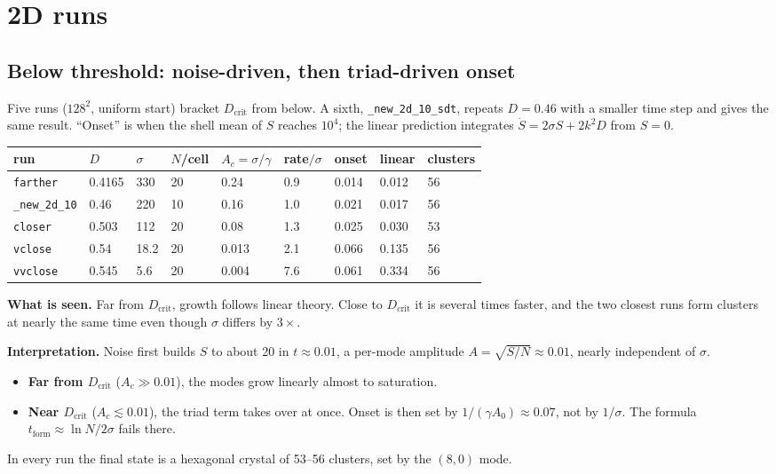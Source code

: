 \documentclass[11pt]{article}
\newcommand{\code}[1]{\texttt{#1}}
\newcommand{\Dc}{D_{\mathrm{crit}}}
\begin{document}
\section{2D runs}

\subsection{Below threshold: noise-driven, then triad-driven onset}
Five runs ($128^2$, uniform start) bracket $\Dc$ from below. A sixth,
\code{\_new\_2d\_10\_sdt}, repeats $D=0.46$ with a smaller time step and gives
the same result. ``Onset'' is when the shell mean of $S$ reaches $10^4$; the
linear prediction integrates $\dot S=2\sigma S+2k^2D$ from $S=0$.
\begin{center}
\begin{tabular}{@{}lllllllll@{}}
\toprule
run & $D$ & $\sigma$ & $N$/cell & $A_c=\sigma/\gamma$ & rate$/\sigma$ & onset & linear & clusters \\
\midrule
\code{farther} & 0.4165 & 330 & 20 & 0.24 & 0.9 & 0.014 & 0.012 & 56 \\
\code{\_new\_2d\_10} & 0.46 & 220 & 10 & 0.16 & 1.0 & 0.021 & 0.017 & 56 \\
\code{closer} & 0.503 & 112 & 20 & 0.08 & 1.3 & 0.025 & 0.030 & 53 \\
\code{vclose} & 0.54 & 18.2 & 20 & 0.013 & 2.1 & 0.066 & 0.135 & 56 \\
\code{vvclose} & 0.545 & 5.6 & 20 & 0.004 & 7.6 & 0.061 & 0.334 & 56 \\
\bottomrule
\end{tabular}
\end{center}
\textbf{What is seen.} Far from $\Dc$, growth follows linear theory. Close to
$\Dc$ it is several times faster, and the two closest runs form clusters at
nearly the same time even though $\sigma$ differs by $3\times$.

\textbf{Interpretation.} Noise first builds $S$ to about 20 in $t\approx0.01$,
a per-mode amplitude $A=\sqrt{S/N}\approx0.01$, nearly independent of $\sigma$.
\begin{itemize}
  \item \textbf{Far from $\Dc$} ($A_c\gg0.01$), the modes grow linearly almost
        to saturation.
  \item \textbf{Near $\Dc$} ($A_c\lesssim0.01$), the triad term takes over at
        once. Onset is then set by $1/(\gamma A_0)\approx0.07$, not by
        $1/\sigma$. The formula $t_{\mathrm{form}}\approx\ln N/2\sigma$ fails there.
\end{itemize}
In every run the final state is a hexagonal crystal of 53--56 clusters, set by
the $(8,0)$ mode.
\end{document}
